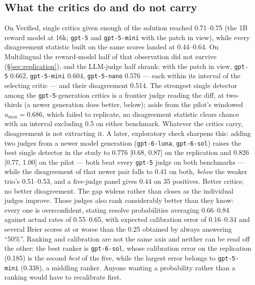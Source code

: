 \documentclass[11pt]{article}
\begin{document}
\subsection{What the critics do and do not carry}\label{sec:carry}
On Verified, single critics given enough of the solution reached 0.71--0.75 (the 1B reward model at 16k; \texttt{gpt-5} and \texttt{gpt-5-mini} with the patch in view), while every disagreement statistic built on the same scores landed at 0.44--0.64. On Multilingual the reward-model half of that observation did not survive (\S\ref{sec:replication}), and the LLM-judge half shrank: with the patch in view, \texttt{gpt-5} 0.662, \texttt{gpt-5-mini} 0.604, \texttt{gpt-5-nano} 0.576 --- each within its interval of the selecting critic --- and their disagreement 0.514. The strongest single detector among the \texttt{gpt-5}-generation critics is a frontier judge reading the diff, at two-thirds (a newer generation does better, below); aside from the pilot's windowed $u_{\max}=0.686$, which failed to replicate, no disagreement statistic clears chance with an interval excluding 0.5 on either benchmark. Whatever the critics carry, disagreement is not extracting it. A later, exploratory check sharpens this: adding two judges from a newer model generation (\texttt{gpt-6-luna}, \texttt{gpt-6-sol}) raises the best single detector in the study to 0.776 [0.68, 0.87] on the replication and 0.826 [0.77, 1.00] on the pilot --- both beat every \texttt{gpt-5} judge on both benchmarks --- while the disagreement of that newer pair falls to 0.41 on both, \emph{below} the weaker trio's 0.51--0.53, and a five-judge panel gives 0.44 on 35 positives. Better critics; no better disagreement. The gap widens rather than closes as the individual judges improve. Those judges also rank considerably better than they know: every one is overconfident, stating resolve probabilities averaging 0.66--0.84 against actual rates of 0.55--0.65, with expected calibration error of 0.16--0.34 and several Brier scores at or worse than the 0.25 obtained by always answering ``50\%''. Ranking and calibration are not the same axis and neither can be read off the other: the best ranker is \texttt{gpt-6-sol}, whose calibration error on the replication (0.185) is the second \emph{best} of the five, while the largest error belongs to \texttt{gpt-5-mini} (0.338), a middling ranker. Anyone wanting a probability rather than a ranking would have to recalibrate first.
\end{document}
